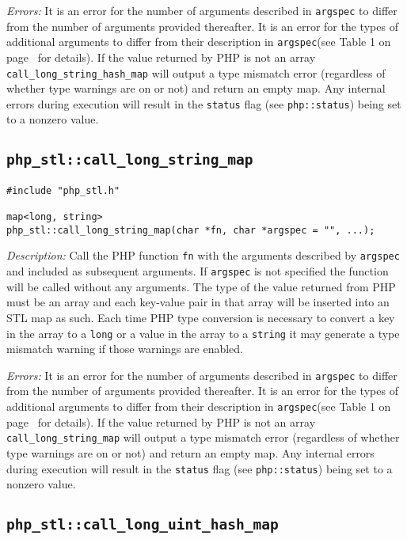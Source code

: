 \documentclass[11pt,titlepage]{article}
\begin{document}
\emph{Errors:} It is an error for the number of arguments described in \verb|argspec| to differ from the number of arguments provided thereafter. It is an error for the types of additional arguments to differ from their description in \verb|argspec|(see Table 1 on page~\pageref{Table1} for details). If the value returned by PHP is not an array \verb|call_long_string_hash_map| will output a type mismatch error (regardless of whether type warnings are on or not) and return an empty map. Any internal errors during execution will result in the \verb|status| flag (see \verb|php::status|) being set to a nonzero value.


\subsection{\texttt{php\_stl::call\_long\_string\_map}}

\begin{verbatim}
#include "php_stl.h"

map<long, string>
php_stl::call_long_string_map(char *fn, char *argspec = "", ...);
\end{verbatim}

\emph{Description:} Call the PHP function \verb|fn| with the arguments described by \verb|argspec| and included as subsequent arguments. If \verb|argspec| is not specified the function will be called without any arguments. The type of the value returned from PHP must be an array and each key-value pair in that array will be inserted into an STL map as such. Each time PHP type conversion is necessary to convert a key in the array to a \verb|long| or a value in the array to a \verb|string| it may generate a type mismatch warning if those warnings are enabled.

\emph{Errors:} It is an error for the number of arguments described in \verb|argspec| to differ from the number of arguments provided thereafter. It is an error for the types of additional arguments to differ from their description in \verb|argspec|(see Table 1 on page~\pageref{Table1} for details). If the value returned by PHP is not an array \verb|call_long_string_map| will output a type mismatch error (regardless of whether type warnings are on or not) and return an empty map. Any internal errors during execution will result in the \verb|status| flag (see \verb|php::status|) being set to a nonzero value.


\subsection{\texttt{php\_stl::call\_long\_uint\_hash\_map}}
\end{document}
